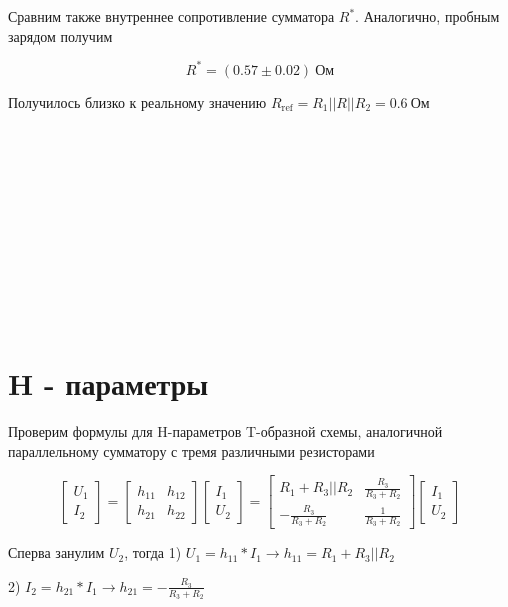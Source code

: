 \documentclass[a4paper]{article}
\begin{document}
Сравним также внутреннее сопротивление сумматора $R^*$. Аналогично, пробным зарядом получим

\begin{equation}
    R^* = (0.57 \pm 0.02) \ \text{Ом}
\end{equation}

Получилось близко к реальному значению \newline $R_\text{ref} = R_1 || R || R_2 = 0.6 \ \text{Ом}$

\\\

\\\

\\\

\\\

\section{H - параметры}

Проверим формулы для H-параметров T-образной схемы,
аналогичной параллельному сумматору с тремя различными резисторами

\[  
\begin{bmatrix}
    U_1\\ 
    I_2 
\end{bmatrix}
 =
\begin{bmatrix}
    h_{11} & h_{12}\\ 
    h_{21} & h_{22}  
\end{bmatrix}
\begin{bmatrix}
    I_1\\ 
    U_2 
\end{bmatrix}
 =
\begin{bmatrix}
    R_1 + R_3||R_2         & \frac{R_3}{R_3 + R_2} \\ 
    -\frac{R_3}{R_3 + R_2} & \frac{1}{R_3 + R_2}
\end{bmatrix}
\begin{bmatrix}
    I_1\\ 
    U_2 
\end{bmatrix}
\]

Сперва занулим $U_2$, тогда 1) $U_1 = h_{11} * I_1 \longrightarrow h_{11} = R_1 + R_3 || R_2$ 

\hspace{4.2cm} 2) $I_2 = h_{21} * I_1 \longrightarrow h_{21} = -\frac{R_3}{R_3 + R_2}$

\vspace{0.3cm}
\end{document}
